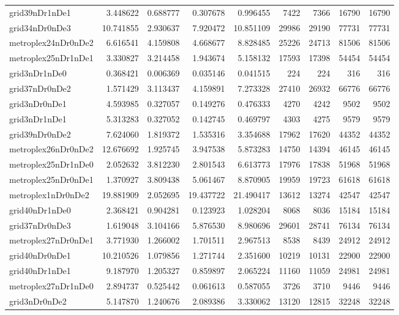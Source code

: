 \begin{longtable}{|l|r|r|r|r|r|r|r|r|}
grid39nDr1nDe1 & 3.448622 & 0.688777 & 0.307678 & 0.996455 & 7422 & 7366 & 16790 & 16790 \\
grid34nDr0nDe3 & 10.741855 & 2.930637 & 7.920472 & 10.851109 & 29986 & 29190 & 77731 & 77731 \\
metroplex24nDr0nDe2 & 6.616541 & 4.159808 & 4.668677 & 8.828485 & 25226 & 24713 & 81506 & 81506 \\
metroplex25nDr1nDe1 & 3.330827 & 3.214458 & 1.943674 & 5.158132 & 17593 & 17398 & 54454 & 54454 \\
grid3nDr1nDe0 & 0.368421 & 0.006369 & 0.035146 & 0.041515 & 224 & 224 & 316 & 316 \\
grid37nDr0nDe2 & 1.571429 & 3.113437 & 4.159891 & 7.273328 & 27410 & 26932 & 66776 & 66776 \\
grid3nDr0nDe1 & 4.593985 & 0.327057 & 0.149276 & 0.476333 & 4270 & 4242 & 9502 & 9502 \\
grid3nDr1nDe1 & 5.313283 & 0.327052 & 0.142745 & 0.469797 & 4303 & 4275 & 9579 & 9579 \\
grid39nDr0nDe2 & 7.624060 & 1.819372 & 1.535316 & 3.354688 & 17962 & 17620 & 44352 & 44352 \\
metroplex26nDr0nDe2 & 12.676692 & 1.925745 & 3.947538 & 5.873283 & 14750 & 14394 & 46145 & 46145 \\
metroplex25nDr1nDe0 & 2.052632 & 3.812230 & 2.801543 & 6.613773 & 17976 & 17838 & 51968 & 51968 \\
metroplex25nDr0nDe1 & 1.370927 & 3.809438 & 5.061467 & 8.870905 & 19959 & 19723 & 61618 & 61618 \\
metroplex1nDr0nDe2 & 19.881909 & 2.052695 & 19.437722 & 21.490417 & 13612 & 13274 & 42547 & 42547 \\
grid40nDr1nDe0 & 2.368421 & 0.904281 & 0.123923 & 1.028204 & 8068 & 8036 & 15184 & 15184 \\
grid37nDr0nDe3 & 1.619048 & 3.104166 & 5.876530 & 8.980696 & 29601 & 28741 & 76134 & 76134 \\
metroplex27nDr0nDe1 & 3.771930 & 1.266002 & 1.701511 & 2.967513 & 8538 & 8439 & 24912 & 24912 \\
grid40nDr0nDe1 & 10.210526 & 1.079856 & 1.271744 & 2.351600 & 10219 & 10131 & 22900 & 22900 \\
grid40nDr1nDe1 & 9.187970 & 1.205327 & 0.859897 & 2.065224 & 11160 & 11059 & 24981 & 24981 \\
metroplex27nDr1nDe0 & 2.894737 & 0.525442 & 0.061613 & 0.587055 & 3726 & 3710 & 9446 & 9446 \\
grid3nDr0nDe2 & 5.147870 & 1.240676 & 2.089386 & 3.330062 & 13120 & 12815 & 32248 & 32248 \\

\end{longtable}
